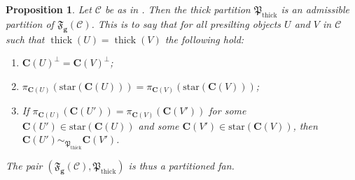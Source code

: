 \documentclass[10pt,twoside, a4paper,reqno]{amsart}
\DeclareMathOperator{\thick}{thick}
\newcommand{\partfan}[1]{\mathfrak{F}_{\bfg}(#1)}
\newcommand{\calC}{\mathcal{C}}
\newcommand{\boldC}{\mathbf{C}}
\newcommand{\bfg}{\mathbf{g}}
\newtheorem{proposition}[theorem]{Proposition}
\theoremstyle{definition}
\begin{document}
\begin{proposition}\label{prop:STTWgeneralisation}
    Let $\calC$ be as in .
    Then the thick partition $\mathfrak{P}_{\thick}$ is an admissible partition of $\partfan{\calC}$.
    This is to say that for all presilting objects $U$ and $V$ in $\calC$ such that $\thick(U)=\thick(V)$ {the following hold:}
    \begin{enumerate}
        \item\label{prop:STTWgeneralisation_1} $\boldC(U)^\perp = \boldC(V)^\perp $;
         \item\label{prop:STTWgeneralisation_2} $\pi_{{\boldC(U)}}(\mathrm{star}({\boldC(U)})) = \pi_{{\boldC(V)}}(\mathrm{star}({\boldC(V)})) $;
    \end{enumerate}
    \begin{enumerate}
    \setcounter{enumi}{2}
        \item\label{prop:STTWgeneralisation_3} If $\pi_{\boldC(U)}(\boldC(U')) = \pi_{\boldC(V)}(\boldC(V'))$ for some $\boldC(U') \in \mathrm{star}(\boldC(U))$ and some $\boldC(V') \in \mathrm{star}(\boldC(V))$, then $\boldC(U') \sim_{\mathfrak{P}_{\thick}} \boldC(V')$.
      \end{enumerate}
    The pair $(\partfan{\calC},\mathfrak{P}_{\thick})$ is thus a partitioned fan.
\end{proposition}
\end{document}
